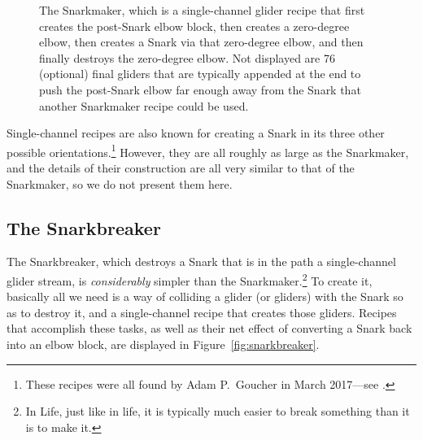 \begin{figure}[!htb]
	\centering
	
	\caption{The Snarkmaker, which is a single-channel glider recipe that first creates the post-Snark elbow block, then creates a zero-degree elbow, then creates a Snark via that zero-degree elbow, and then finally destroys the zero-degree elbow. Not displayed are 76 (optional) final gliders that are typically appended at the end to push the post-Snark elbow far enough away from the Snark that another Snarkmaker recipe could be used.}\label{fig:snarkmaker}
\end{figure}

Single-channel recipes are also known for creating a Snark in its three other possible orientations.\footnote{These recipes were all found by Adam P.~Goucher in March 2017---see .} However, they are all roughly as large as the Snarkmaker, and the details of their construction are all very similar to that of the Snarkmaker, so we do not present them here.



\subsection{The Snarkbreaker}\label{sec:snarkbreaker}

The Snarkbreaker, which destroys a Snark that is in the path a single-channel glider stream, is \emph{considerably} simpler than the Snarkmaker.\footnote{In Life, just like in life, it is typically much easier to break something than it is to make it.} To create it, basically all we need is a way of colliding a glider (or gliders) with the Snark so as to destroy it, and a single-channel recipe that creates those gliders. Recipes that accomplish these tasks, as well as their net effect of converting a Snark back into an elbow block, are displayed in Figure~\ref{fig:snarkbreaker}.

